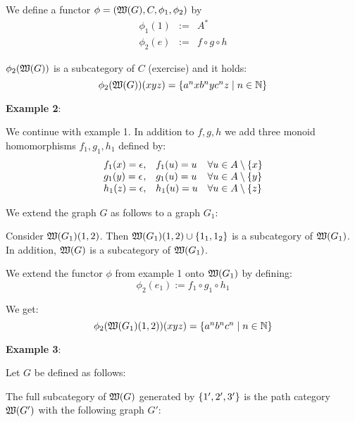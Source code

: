 We define a functor $\phi = (\mbox{$\mathfrak{W}(G)$}, C, \phi_1, \phi_2)$ by
\begin{eqnarray*}
\phi_1(1) & := & A^* \\
\phi_2(e) & := & f \circ g \circ h
\end{eqnarray*}

$\phi_2(\mbox{$\mathfrak{W}(G)$})$ is a subcategory of $C$ (exercise) and it holds:
\[ \phi_2(\mbox{$\mathfrak{W}(G)$})(xyz) = \mbox{$\{a^n x b^n y c^n z \mid n \in \mathbb{N}\}$}
\]

\bigskip
{\bf Example 2}:

We continue with example 1. In addition to $f,g,h$ we add three monoid
homomorphisms $f_1, g_1, h_1$ defined by:
\[\begin{array}{l@{,\quad}l@{\quad}l}
f_1(x) = \epsilon & f_1(u) = u & \forall u \in A \setminus \setof{x} \\
g_1(y) = \epsilon & g_1(u) = u & \forall u \in A \setminus \setof{y} \\
h_1(z) = \epsilon & h_1(u) = u & \forall u \in A \setminus \setof{z}
\end{array}\]

We extend the graph $G$ as follows to a graph $G_1$:

\begin{center}

\end{center}

Consider $\mbox{$\mathfrak{W}(G_1)$}(1,2)$. Then $\mbox{$\mathfrak{W}(G_1)$}(1,2) \cup \mbox{$\{1_1,
1_2\}$}$ is a subcategory of $\mbox{$\mathfrak{W}(G_1)$}$. In addition, $\mbox{$\mathfrak{W}(G)$}$ is a subcategory of
$\mbox{$\mathfrak{W}(G_1)$}$.

We extend the functor $\phi$ from example 1 onto $\mbox{$\mathfrak{W}(G_1)$}$ by defining:
\[ \phi_2(e_1) := f_1 \circ g_1 \circ h_1 \]

We get:
\[ \phi_2(\mbox{$\mathfrak{W}(G_1)$}(1,2))(xyz) = \mbox{$\{a^n b^n c^n \mid n \in \mathbb{N}\}$}
\]

\bigskip
{\bf Example 3}:

Let $G$ be defined as follows:

\begin{center}

\end{center}

The full subcategory of $\mbox{$\mathfrak{W}(G)$}$ generated by $\mbox{$\{1', 2', 3'\}$}$ is the
path category $\mbox{$\mathfrak{W}(G')$}$ with the following graph $G'$:

\begin{center}

\end{center}


